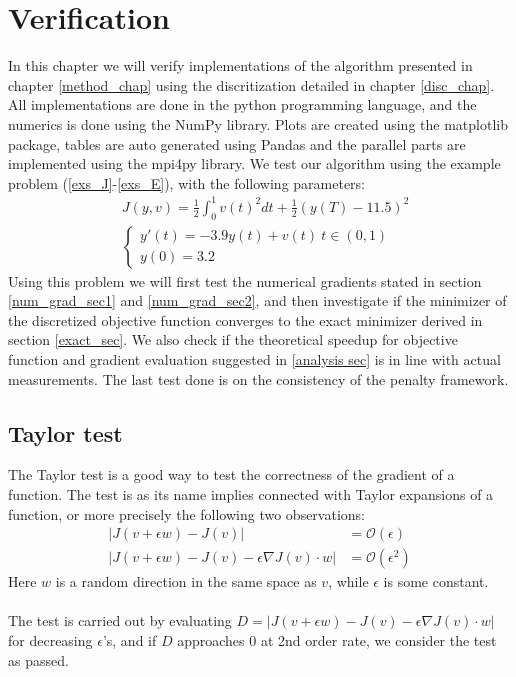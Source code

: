 \chapter{Verification}\label{Verification chapter}
In this chapter we will verify implementations of the algorithm presented in chapter \ref{method_chap} using the discritization detailed in chapter \ref{disc_chap}. All implementations are done in the python programming language, and the numerics is done using the NumPy\cite{walt2011numpy} library. Plots are created using the matplotlib\cite{Hunter:2007} package, tables are auto generated using Pandas\cite{mckinney2010data} and the parallel parts are implemented using the mpi4py\cite{dalcin2007mpi4py} library. We test our algorithm using the example problem (\ref{exs_J}-\ref{exs_E}), with the following parameters:
\begin{align}
&J(y,v) = \frac{1}{2}\int_0^1v(t)^2dt + \frac{1}{2}(y(T)-11.5)^2 \label{test_J}\\
&\left\{
     \begin{array}{lr}
       	y'(t) = -3.9y(t)+v(t) \ t\in(0,1)\\
       	y(0)=3.2
     \end{array}
   \right. \label{test_E}
\end{align}
Using this problem we will first test the numerical gradients stated in section \ref{num_grad_sec1} and \ref{num_grad_sec2}, and then investigate if the minimizer of the discretized objective function converges to the exact minimizer derived in section \ref{exact_sec}. We also check if the theoretical speedup for objective function and gradient evaluation suggested in \ref{analysis sec} is in line with actual measurements. The last test done is on the consistency of the penalty framework. 
\section{Taylor test} \label{Taylor_sec}
The Taylor test is a good way to test the correctness of the gradient of a function. The test is as its name implies connected with Taylor expansions of a function, or more precisely the following two observations:
\begin{align*}
|J(v+\epsilon w)-J(v)| &= \mathcal{O}(\epsilon) \\
|J(v+\epsilon w)-J(v)-\epsilon\nabla J(v)\cdot w| &= \mathcal{O}(\epsilon^2)
\end{align*}
Here $w$ is a random direction in the same space as $v$, while $\epsilon$ is some constant. 
\\
\\
The test is carried out by evaluating $D=|J(v+\epsilon w)-J(v)-\epsilon\nabla J(v)\cdot w|$ for decreasing $\epsilon$'s, and if $D$ approaches 0 at 2nd order rate, we consider the test as passed.
